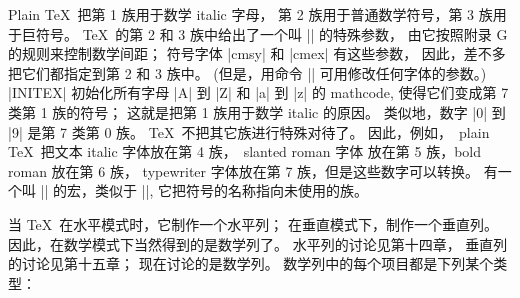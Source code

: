 {{{{{%
\ddanger Plain \TeX\ 把第 1 族用于数学 italic 字母，
第 2 族用于普通数学符号，第 3 族用于巨符号。%
 \TeX\ 的第 2 和 3 族中给出了一个叫 |\fontdimen| 的特殊参数，
由它按照附录 G 的规则来控制数学间距；
符号字体 |cmsy| 和 |cmex| 有这些参数，
因此，差不多把它们都指定到第 2 和 3 族中。%
(但是，用命令 |\fontdimen| 可用修改任何字体的参数。)
|INITEX| 初始化所有字母 |A| 到 |Z| 和 |a| 到 |z| 的 mathcode,
使得它们变成第 7 类第 1 族的符号；
这就是把第 1 族用于数学 italic 的原因。%
类似地，数字 |0| 到 |9| 是第 7 类第 0 族。%
 \TeX\ 不把其它族进行特殊对待了。%
因此，例如，~plain \TeX\ 把文本 italic 字体放在第 4 族，~slanted roman 字体%
放在第 5 族，bold roman 放在第 6 族，
typewriter 字体放在第 7 族，但是这些数字可以转换。%
有一个叫 |\newfam| 的宏，类似于 |\newbox|,
它把符号的名称指向未使用的族。

\ddanger 当 \TeX\ 在水平模式时，它制作一个水平列；
在垂直模式下，制作一个垂直列。%
因此，在数学模式下当然得到的是数学列了。%
水平列的讨论见第十四章，
垂直列的讨论见第十五章；
现在讨论的是数学列。%
数学列中的每个项目都是下列某个类型：\enddanger

}}}}}
